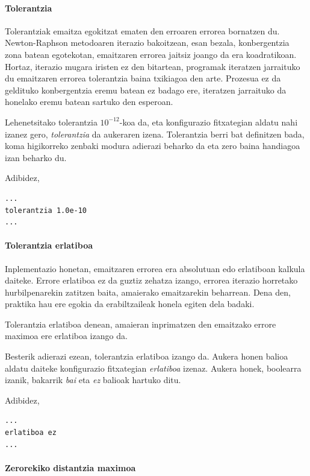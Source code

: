 \documentclass[10pt,a4paper,basque]{article}
\begin{document}
\paragraph{Tolerantzia}

Tolerantziak emaitza egokitzat ematen den erroaren errorea bornatzen du. Newton-Raphson metodoaren iterazio bakoitzean, esan bezala, konbergentzia zona batean egotekotan, emaitzaren errorea jaitsiz joango da era koadratikoan. Hortaz, iterazio mugara iristen ez den bitartean, programak iteratzen jarraituko du emaitzaren errorea tolerantzia baina txikiagoa den arte. Prozesua ez da geldituko konbergentzia eremu batean ez badago ere, iteratzen jarraituko da honelako eremu batean sartuko den esperoan.

Lehenetsitako tolerantzia $10^{-12}$-koa da, eta konfigurazio fitxategian aldatu nahi izanez gero, \emph{tolerantzia} da aukeraren izena. Tolerantzia berri bat definitzen bada, koma higikorreko zenbaki modura adierazi beharko da eta zero baina handiagoa izan beharko du.

Adibidez,

\begin{lstlisting}
...
tolerantzia 1.0e-10
...
\end{lstlisting}

\paragraph{Tolerantzia erlatiboa}

Inplementazio honetan, emaitzaren errorea era absolutuan edo erlatiboan kalkula daiteke. Errore erlatiboa ez da guztiz zehatza izango, errorea iterazio horretako hurbilpenarekin zatitzen baita, amaierako emaitzarekin beharrean. Dena den, praktika hau ere egokia da erabiltzaileak honela egiten dela badaki.

Tolerantzia erlatiboa denean, amaieran inprimatzen den emaitzako errore maximoa ere erlatiboa izango da.

Besterik adierazi ezean, tolerantzia erlatiboa izango da. Aukera honen balioa aldatu daiteke konfigurazio fitxategian \emph{erlatiboa} izenaz. Aukera honek, boolearra izanik, bakarrik \emph{bai} eta \emph{ez} balioak hartuko ditu.

Adibidez,

\begin{lstlisting}
...
erlatiboa ez
...
\end{lstlisting}

\paragraph{Zerorekiko distantzia maximoa}
\end{document}
